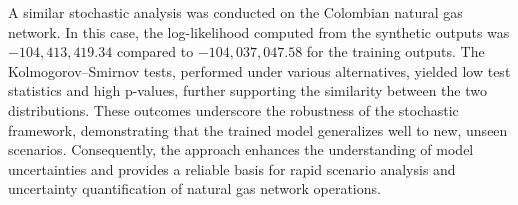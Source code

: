 A similar stochastic analysis was conducted on the Colombian natural gas network. In this case, the log-likelihood computed from the synthetic outputs was \(-104,413,419.34\) compared to \(-104,037,047.58\) for the training outputs. The Kolmogorov–Smirnov tests, performed under various alternatives, yielded low test statistics and high p-values, further supporting the similarity between the two distributions. These outcomes underscore the robustness of the stochastic framework, demonstrating that the trained model generalizes well to new, unseen scenarios. Consequently, the approach enhances the understanding of model uncertainties and provides a reliable basis for rapid scenario analysis and uncertainty quantification of natural gas network operations.


